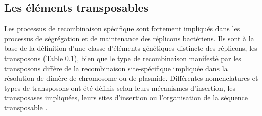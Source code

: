  
\subsection{Les éléments transposables}\label{transposon}
	Les processus de recombinaison spécifique sont fortement impliqués dans les processus de ségrégation et de maintenance des réplicons bactériens. Ils sont à la base de la définition d'une classe d'éléments génétiques distincte des réplicons, les transposons (Table \ref{transposon}), bien que le type de recombinaison manifesté par les transposons diffère de la recombinaison site-spécifique impliquée dans la résolution de dimère de chromosome ou de plasmide. Différentes nomenclatures et types de transposons ont été définis selon leurs mécanismes d'insertion, les transposases impliquées, leurs sites d'insertion ou l'organisation de la séquence transposable \citep{Roberts2008, higgins2005bacterial}. 


